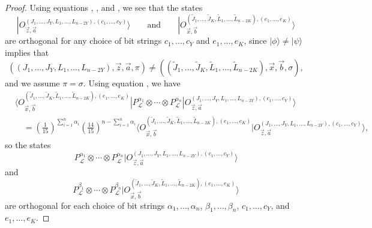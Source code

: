 \documentclass[../thesis-main/thesis-main]{subfiles}
\begin{document}
\begin{proof}
Using equations , , and , we see that the states 
\begin{equation}
|O_{\vec{z},\vec{a}}^{(J_{1},\ldots,J_{Y},L_{1},\ldots,L_{n-2Y}),(c_{1},\ldots,c_{Y})}\rangle \qquad \text{and} \qquad | O_{\vec{x},\vec{b}}^{(\tilde{J}_{1},\ldots,\tilde{J}_{K},\tilde{L}_{1},\ldots,\tilde{L}_{n-2K}),(e_{1},\ldots,e_{K})}\rangle
\end{equation}
are orthogonal for any choice of bit strings $c_{1},\ldots,c_{Y}$ and $e_{1},\ldots,e_{K}$, since $|\phi\rangle \ne |\psi\rangle$ implies that
\begin{equation}
((J_{1},\ldots,J_{Y},L_{1},\ldots,L_{n-2Y}),\vec{z},\vec{a},\pi)\neq ((\tilde{J}_{1},\ldots,\tilde{J}_{K},\tilde{L}_{1},\ldots,\tilde{L}_{n-2K}),\vec{x},\vec{b},\sigma),
\end{equation}
and we assume $\pi = \sigma$.  Using equation , we have
\begin{align}
& \langle O_{\vec{x},\vec{b}}^{(\tilde{J}_{1},\ldots,\tilde{J}_{K},\tilde{L}_{1},\ldots,\tilde{L}_{n-2K}),(e_{1},\ldots,e_{K})}|P_{\mathcal{L}}^{\alpha_{1}}\otimes 
\cdots\otimes P_{\mathcal{L}}^{\alpha_{n}}|O_{\vec{z},\vec{a}}^{(J_{1},\ldots,J_{Y},L_{1},\ldots,L_{n-2Y}),(c_{1},\ldots,c_{Y})}\rangle \nonumber\\
&\quad= \left(\frac{1}{15}\right)^{\sum_{i=1}^{n}\alpha_i}\left(\frac{14}{15}\right)^{n-\sum_{i=1}^{n}\alpha_i}\langle O_{\vec{x},\vec{b}}^{(\tilde{J}_{1},\ldots,\tilde{J}_{K},\tilde{L}_{1},\ldots,\tilde{L}_{n-2K}),(e_{1},\ldots,e_{K})}|O_{\vec{z},\vec{a}}^{(J_{1},\ldots,J_{Y},L_{1},\ldots,L_{n-2Y}),(c_{1},\ldots,c_{Y})}\rangle,
\end{align}
so the states
\begin{equation}
P_{\mathcal{L}}^{\alpha_{1}}\otimes 
\cdots\otimes P_{\mathcal{L}}^{\alpha_{n}}|O_{\vec{z},\vec{a}}^{(J_{1},\ldots,J_{Y},L_{1},\ldots,L_{n-2Y}),(c_{1},\ldots,c_{Y})}\rangle\label{eq:intermediate_O_states}
\end{equation}
and 
\begin{equation}
P_{\mathcal{L}}^{\beta_{1}}\otimes 
\cdots\otimes P_{\mathcal{L}}^{\beta_{n}}| O_{\vec{x},\vec{b}}^{(\tilde{J}_{1},\ldots,\tilde{J}_{K},\tilde{L}_{1},\ldots,\tilde{L}_{n-2K}),(e_{1},\ldots,e_{K})}\rangle
\end{equation}
are orthogonal for each choice of bit strings $\alpha_1,\ldots,\alpha_n$, $\beta_1,\ldots,\beta_n$, $c_{1},\ldots,c_{Y}$, and $e_{1},\ldots,e_{K}$. 



\end{proof}
\end{document}
